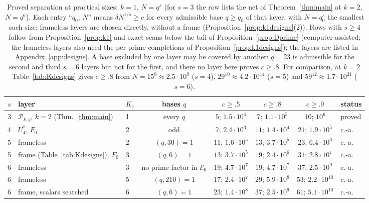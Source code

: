 \documentclass[11pt]{amsart}
\theoremstyle{definition}
\theoremstyle{plain}
\begin{document}
\begin{table}[tbp]
\centering\footnotesize\setlength{\tabcolsep}{3pt}
\begin{tabular}{@{}cllccccl@{}}
\toprule
$s$ & layer & $K_1$ & bases $q$ & $c\ge.5$ & $c\ge.8$ & $c\ge.9$ & status\\
\midrule
3 & $\mathcal P_{k,q}$, $k=2$ (Thm.~\ref{thm:main}) & 1 & every $q$ & $5$; $1.5\cdot10^4$ & $7$; $1.1\cdot10^5$ & $10$; $10^6$ & proved\\
4 & $U^*_4$, $F_0$ & 2 & odd & $7$; $2.4\cdot10^3$ & $11$; $1.4\cdot10^4$ & $21$; $1.9\cdot10^5$ & c.-a.\\
5 & frameless & 2 & $(q,30)=1$ & $11$; $1.6\cdot10^5$ & $13$; $3.7\cdot10^5$ & $23$; $6.4\cdot10^6$ & c.-a.\\
5 & frame (Table~\ref{tab:Kdesigns}), $F_0$ & 3 & $(q,6)=1$ & $13$; $3.7\cdot10^5$ & $19$; $2.4\cdot10^6$ & $31$; $2.8\cdot10^7$ & c.-a.\\
6 & frameless & 3 & no prime factor in $\mathcal E_6$ & $19$; $4.7\cdot10^7$ & $19$; $4.7\cdot10^7$ & $37$; $2.5\cdot10^9$ & c.-a.\\
6 & frameless & 5 & $(q,210)=1$ & $17$; $2.4\cdot10^7$ & $29$; $5.9\cdot10^8$ & $53$; $2.2\cdot10^{10}$ & c.-a.\\
6 & frame, scalars searched & 6 & $(q,6)=1$ & $23$; $1.4\cdot10^8$ & $37$; $2.5\cdot10^9$ & $61$; $5.1\cdot10^{10}$ & c.-a.\\
\bottomrule
\end{tabular}
\medskip
\caption{Proved separation at practical sizes: $k=1$, $N=q^s$ (for $s=3$ the row lists the net of Theorem~\ref{thm:main} at $k=2$, $N=q^6$). Each entry ``$q_0$; $N$'' means $\delta N^{1/s}\ge c$ for every admissible base $q\ge q_0$ of that layer, with $N=q_0^s$ the smallest such size; frameless layers are chosen directly, without a frame (Proposition~\ref{prop:k1designs}(2)). Rows with $s\ge4$ follow from Proposition~\ref{prop:k1} and exact scans below the tail of Proposition~\ref{prop:Dprime} (computer-assisted; the frameless layers also need the per-prime completions of Proposition~\ref{prop:k1designs}); the layers are listed in Appendix~\ref{app:designs}. A base excluded by one layer may be covered by another: $q=23$ is admissible for the second and third $s=6$ layers but not for the first, and there no layer here proves $c\ge.8$. For comparison, at $k=2$ Table~\ref{tab:Kdesigns} gives $c\ge.8$ from $N=15^8\approx2.5\cdot10^9$ ($s=4$), $29^{10}\approx4.2\cdot10^{14}$ ($s=5$) and $59^{12}\approx1.7\cdot10^{21}$ ($s=6$).}
\label{tab:practical}
\end{table}
\end{document}
